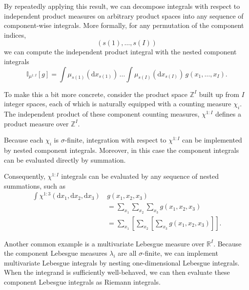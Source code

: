 \documentclass[
  letterpaper,
  DIV=11,
  numbers=noendperiod]{scrartcl}
\begin{document}
By repeatedly applying this result, we can decompose integrals with
respect to independent product measures on arbitrary product spaces into
any sequence of component-wise integrals. More formally, for any
permutation of the component indices, \[
( s(1), \ldots, s(I) )
\] we can compute the independent product integral with the nested
component integrals \[
\mathbb{I}_{ \mu^{1:I} }[ g ]
=
\int \mu_{s(1)} ( \mathrm{d} x_{s(1)} ) \,
\ldots
\int \mu_{s(I)} ( \mathrm{d} x_{s(I)} ) \,
g( x_{1}, \ldots, x_{I} ).
\]

To make this a bit more concrete, consider the product space
\(\mathbb{Z}^{I}\) built up from \(I\) integer spaces, each of which is
naturally equipped with a counting measure \(\chi_{i}\). The independent
product of these component counting measures, \(\chi^{1:I}\) defines a
product measure over \(\mathbb{Z}^{I}\).

Because each \(\chi_{i}\) is \(\sigma\)-finite, integration with respect
to \(\chi^{1:I}\) can be implemented by nested component integrals.
Moreover, in this case the component integrals can be evaluated directly
by summation.

Consequently, \(\chi^{1:I}\) integrals can be evaluated by any sequence
of nested summations, such as \begin{align*}
\int \chi^{1:3}(
  \mathrm{d} x_{1}, \mathrm{d} x_{2}, \mathrm{d} x_{3}
) \,
&g( x_{1}, x_{2}, x_{3} )
\\
&=
\sum_{ x_{1} } \sum_{ x_{2} } \sum_{ x_{3} }
g( x_{1}, x_{2}, x_{3} )
\\
&=
\sum_{ x_{1} } \left[
  \sum_{ x_{2} } \left[
    \sum_{ x_{3} } g( x_{1}, x_{2}, x_{3} )
  \right]
\right].
\end{align*}

Another common example is a multivariate Lebesgue measure over
\(\mathbb{R}^{I}\). Because the component Lebesgue measures
\(\lambda_{i}\) are all \(\sigma\)-finite, we can implement multivariate
Lebesgue integrals by nesting one-dimensional Lebesgue integrals. When
the integrand is sufficiently well-behaved, we can then evaluate these
component Lebesgue integrals as Riemann integrals.
\end{document}
